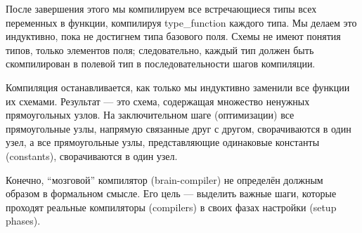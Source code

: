 После завершения этого мы компилируем все встречающиеся типы всех переменных в функции, компилируя type\_function каждого типа. Мы делаем это индуктивно, пока не достигнем типа базового поля. Схемы не имеют понятия типов, только элементов поля; следовательно, каждый тип должен быть скомпилирован в полевой тип в последовательности шагов компиляции.

Компиляция останавливается, как только мы индуктивно заменили все функции их схемами. Результат --- это схема, содержащая множество ненужных прямоугольных узлов. На заключительном шаге  (оптимизации) все прямоугольные узлы, напрямую связанные друг с другом, сворачиваются в один узел, а все прямоугольные узлы, представляющие одинаковые константы (constants), сворачиваются в один узел.

Конечно, ``мозговой'' компилятор (brain-compiler)  не определён должным образом в формальном смысле. Его цель --- выделить важные шаги, которые проходят реальные компиляторы (compilers) в своих фазах настройки (setup phases).
